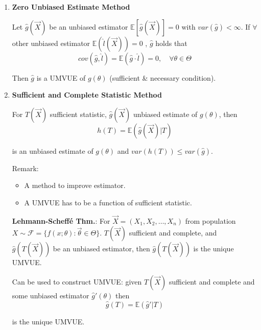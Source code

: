     \begin{enumerate}[topsep=2pt,itemsep=0pt]
    \item \textbf{Zero Unbiased Estimate Method}
                
        Let $\hat{g}(\vec{X})$ be an unbiased estimator $ \mathbb{E}\left[ \hat{g}(\vec{X}) \right] =0 $ with $var(\hat{g})<\infty$. If $\forall$ other unbiased estimator $\mathbb{E}(\hat{l}(\vec{X}))=0$ , $\hat{g}$ holds that
        \begin{equation}
            cov(\hat{g},\hat{l})=\mathbb{E}(\hat{g}\cdot\hat{l})=0,\quad\forall\theta\in\Theta    
        \end{equation}

        Then $\hat{g}$ is a UMVUE of $g(\theta)$ (sufficient \& necessary condition).
    \item \textbf{Sufficient and Complete Statistic Method}

        For $T(\vec{X})$ sufficient statistic, $\hat{g}(\vec{X})$ unbiased estimate of $g(\theta)$, then 
    \begin{equation}
        h(T)=\mathbb{E}(\hat{g}(\vec{X})| T)    
    \end{equation}

        is an unbiased estimate of $g(\theta)$ and $var(h(T))\leq var(\hat{g})$.

        Remark:
        \begin{itemize}
            \item A method to improve estimator.
            \item A UMVUE has to be a function of sufficient statistic.
        \end{itemize}

        \textbf{Lehmann-Scheffé Thm.}: For $\vec{X}=(X_1,X_2,\ldots,X_n)$ from population $X\sim\mathscr{F}=\{f(x;\theta):\vec{\theta}\in\Theta\}$. $T(\vec{X})$ sufficient and complete, and $\hat{g}(T(\vec{X}))$ be an unbiased estimator, then $\hat{g}(T(\vec{X}))$ is the unique UMVUE.

        Can be used to construct UMVUE: given $T(\vec{X})$ sufficient and complete and some unbiased estimator $\hat{g}\prime(\theta)$ then 
        \begin{equation}
            \hat{g}(T)=\mathbb{E}(\hat{g}\prime|T)    
        \end{equation}

        is the unique UMVUE.




\end{enumerate}
